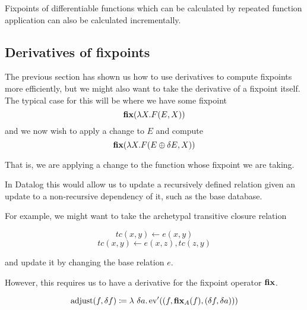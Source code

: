 \begin{corollary}
\label{corollary:diffFP}
  Fixpoints of differentiable functions which can be calculated by repeated
  function application can also be calculated incrementally.
\end{corollary}

\subsection{Derivatives of fixpoints}
\label{sec:fixpointDerivatives}

The previous section has shown us how to use derivatives to compute fixpoints
more efficiently, but we might also want to take the derivative of a fixpoint
itself. The typical case for this will be where we have some fixpoint
$$\textbf{fix} (\lambda X . F(E, X))$$
and we now wish to apply a change to $E$ and compute
$$\textbf{fix} (\lambda X . F(E \oplus \delta E, X))$$

That is, we are applying a change to the function whose fixpoint we are taking.

In Datalog this would allow us to update a recursively defined relation given an
update to a non-recursive dependency of it, such as the base database.

For example, we might want to take the archetypal transitive closure relation

$$tc(x, y) \leftarrow e(x, y)$$
$$tc(x, y) \leftarrow e(x, z), tc(z, y)$$

and update it by changing the base relation $e$.

However, this requires us to have a derivative for the fixpoint operator $\textbf{fix}$.

\newcommand{\theadjustment}{\operatorname{adjust}}

\begin{defn}
  $$\theadjustment(f, \change{f}) \defeq \lambda\ \change{a} . \derive{\ev}((f,
  \fixpoint_A(f), (\change{f}, \change{a})))$$
\end{defn}

